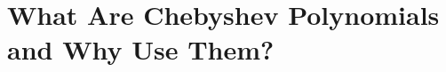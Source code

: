 \documentclass[xcolor={rgb,dvipsnames}]{beamer}		%
\begin{document}

\section{What Are Chebyshev Polynomials and Why Use Them?}
\begin{frame}
\tableofcontents[currentsection]
\end{frame}
\end{document}
